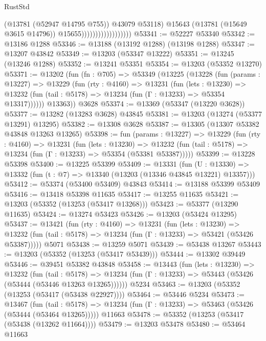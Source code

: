 \begin{lexlean}{RustStd}
\begin{coremodule}
                                          (@13781 (@52947 @14795 @755))
                                          @43079
                                          @53118)
                                        @15643
                                        (@13781 (@15649 @3615 @14796))
                                        @15655))))))))))))))))))
@53341 := @52227 @53340
@53342 := @13186 @1288
@53346 := @13188 (@13192 @1288) (@13198 @1288)
@53347 := @13207 @43842
@53349 := @13203 (@53347 @13222)
@53351 := @13245 (@13246 @1288)
@53352 := @13241 @53351
@53354 := @13203 (@53352 @13270)
@53371 := @13202
    (fun (fn : @705) =>
    @53349
      (@13225
        (@13228
          (fun (params : @13227) =>
          @13229
            (fun (rty : @4160) =>
            @13231
              (fun (lets : @13230) =>
              @13232 (fun (tail : @5178) => @13234 (fun (Γ : @13233) => @53354 @13317))))))
        @13363))
    @3628
@53374 := @13369 (@53347 (@13220 @3628))
@53377 := @13282 (@13283 @3628) @43845
@53381 := @13203 (@13274 (@53377 @13291) @13295)
@53382 := @13308 @3628
@53387 := @13305 (@13307 @53382 @43848 @13263 @13265)
@53398 := fun (params : @13227) =>
  @13229
    (fun (rty : @4160) =>
    @13231
      (fun (lets : @13230) =>
      @13232 (fun (tail : @5178) => @13234 (fun (Γ : @13233) => @53354 (@53381 @53387)))))
@53399 := @13228 @53398
@53400 := @13225 @53399
@53409 := @13331
    (fun (U : @13330) => @13332 (fun (t : @7) => @13340 (@13203 (@13346 @43845 @13221) @13357)))
@53412 := @53374 (@53400 @53409) @43843
@53414 := @13188 @53399 @53409
@53416 := @13418 @53398 @11635
@53417 := @13255 @11635
@53421 := @13203 (@53352 (@13253 (@53417 @13268)))
@53423 := @53377 (@13290 @11635)
@53424 := @13274 @53423
@53426 := @13203 (@53424 @13295)
@53437 := @13421
    (fun (rty : @4160) =>
    @13231
      (fun (lets : @13230) =>
      @13232 (fun (tail : @5178) => @13234 (fun (Γ : @13233) => @53421 (@53426 @53387)))))
    @5071
@53438 := @13259 @5071
@53439 := @53438 @13267
@53443 := @13203 (@53352 (@13253 (@53417 @53439)))
@53444 := @13302 @39449
@53446 := @39451 @53382 @43848
@53458 := @13443
    (fun (lets : @13230) =>
    @13232
      (fun (tail : @5178) =>
      @13234 (fun (Γ : @13233) => @53443 (@53426 (@53444 (@53446 @13263 @13265))))))
    @5234
@53463 := @13203 (@53352 (@13253 (@53417 (@53438 @22927))))
@53464 := @53446 @5234
@53473 := @13467
    (fun (tail : @5178) => @13234 (fun (Γ : @13233) => @53463 (@53426 (@53444 (@53464 @13265)))))
    @11663
@53478 := @53352 (@13253 (@53417 (@53438 (@13262 @11664))))
@53479 := @13203 @53478
@53480 := @53464 @11663

\end{coremodule}
\end{lexlean}
